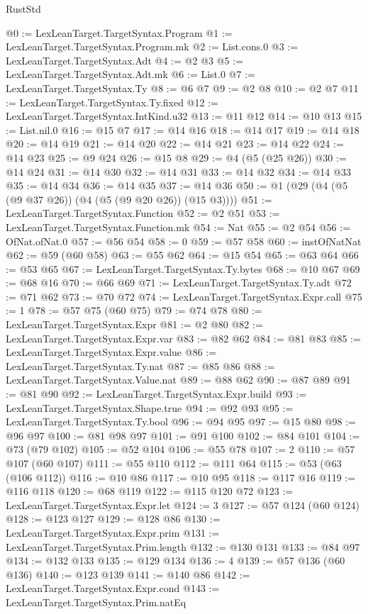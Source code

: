 \begin{lexlean}{RustStd}
\begin{coremodule}
@0 := LexLeanTarget.TargetSyntax.Program
@1 := LexLeanTarget.TargetSyntax.Program.mk
@2 := List.cons.{0}
@3 := LexLeanTarget.TargetSyntax.Adt
@4 := @2 @3
@5 := LexLeanTarget.TargetSyntax.Adt.mk
@6 := List.{0}
@7 := LexLeanTarget.TargetSyntax.Ty
@8 := @6 @7
@9 := @2 @8
@10 := @2 @7
@11 := LexLeanTarget.TargetSyntax.Ty.fixed
@12 := LexLeanTarget.TargetSyntax.IntKind.u32
@13 := @11 @12
@14 := @10 @13
@15 := List.nil.{0}
@16 := @15 @7
@17 := @14 @16
@18 := @14 @17
@19 := @14 @18
@20 := @14 @19
@21 := @14 @20
@22 := @14 @21
@23 := @14 @22
@24 := @14 @23
@25 := @9 @24
@26 := @15 @8
@29 := @4 (@5 (@25 @26))
@30 := @14 @24
@31 := @14 @30
@32 := @14 @31
@33 := @14 @32
@34 := @14 @33
@35 := @14 @34
@36 := @14 @35
@37 := @14 @36
@50 := @1 (@29 (@4 (@5 (@9 @37 @26)) (@4 (@5 (@9 @20 @26)) (@15 @3))))
@51 := LexLeanTarget.TargetSyntax.Function
@52 := @2 @51
@53 := LexLeanTarget.TargetSyntax.Function.mk
@54 := Nat
@55 := @2 @54
@56 := OfNat.ofNat.{0}
@57 := @56 @54
@58 := 0
@59 := @57 @58
@60 := instOfNatNat
@62 := @59 (@60 @58)
@63 := @55 @62
@64 := @15 @54
@65 := @63 @64
@66 := @53 @65
@67 := LexLeanTarget.TargetSyntax.Ty.bytes
@68 := @10 @67
@69 := @68 @16
@70 := @66 @69
@71 := LexLeanTarget.TargetSyntax.Ty.adt
@72 := @71 @62
@73 := @70 @72
@74 := LexLeanTarget.TargetSyntax.Expr.call
@75 := 1
@78 := @57 @75 (@60 @75)
@79 := @74 @78
@80 := LexLeanTarget.TargetSyntax.Expr
@81 := @2 @80
@82 := LexLeanTarget.TargetSyntax.Expr.var
@83 := @82 @62
@84 := @81 @83
@85 := LexLeanTarget.TargetSyntax.Expr.value
@86 := LexLeanTarget.TargetSyntax.Ty.nat
@87 := @85 @86
@88 := LexLeanTarget.TargetSyntax.Value.nat
@89 := @88 @62
@90 := @87 @89
@91 := @81 @90
@92 := LexLeanTarget.TargetSyntax.Expr.build
@93 := LexLeanTarget.TargetSyntax.Shape.true
@94 := @92 @93
@95 := LexLeanTarget.TargetSyntax.Ty.bool
@96 := @94 @95
@97 := @15 @80
@98 := @96 @97
@100 := @81 @98 @97
@101 := @91 @100
@102 := @84 @101
@104 := @73 (@79 @102)
@105 := @52 @104
@106 := @55 @78
@107 := 2
@110 := @57 @107 (@60 @107)
@111 := @55 @110
@112 := @111 @64
@115 := @53 (@63 (@106 @112))
@116 := @10 @86
@117 := @10 @95
@118 := @117 @16
@119 := @116 @118
@120 := @68 @119
@122 := @115 @120 @72
@123 := LexLeanTarget.TargetSyntax.Expr.let
@124 := 3
@127 := @57 @124 (@60 @124)
@128 := @123 @127
@129 := @128 @86
@130 := LexLeanTarget.TargetSyntax.Expr.prim
@131 := LexLeanTarget.TargetSyntax.Prim.length
@132 := @130 @131
@133 := @84 @97
@134 := @132 @133
@135 := @129 @134
@136 := 4
@139 := @57 @136 (@60 @136)
@140 := @123 @139
@141 := @140 @86
@142 := LexLeanTarget.TargetSyntax.Expr.cond
@143 := LexLeanTarget.TargetSyntax.Prim.natEq

\end{coremodule}
\end{lexlean}
